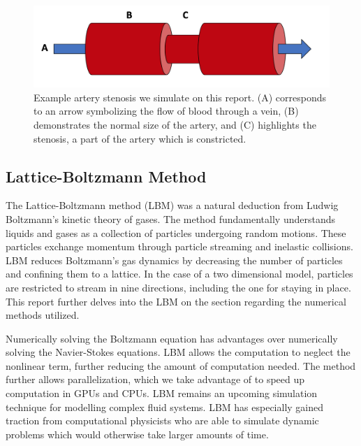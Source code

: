 \begin{figure}[H]
\includegraphics[scale=0.3]{DavidPineiro/stenosis_vein.png}
\centering
\caption{Example artery stenosis we simulate on this report. (A) corresponds to an arrow symbolizing the flow of blood through a vein, (B) demonstrates the normal size of the artery, and (C) highlights the stenosis, a part of the artery which is constricted.}
\label{fig:stenosis_example}
\end{figure}

\subsection{Lattice-Boltzmann Method}
The Lattice-Boltzmann method (LBM) was a natural deduction from Ludwig Boltzmann’s kinetic theory of gases. The method fundamentally understands liquids and gases as a collection of particles undergoing random motions. These particles exchange momentum through particle streaming and inelastic collisions. LBM reduces Boltzmann’s gas dynamics by decreasing the number of particles and confining them to a lattice. In the case of a two dimensional model, particles are restricted to stream in nine directions, including the one for staying in place. This report further delves into the LBM on the section regarding the numerical methods utilized. 


Numerically solving the Boltzmann equation has advantages over numerically solving the Navier-Stokes equations. LBM allows the computation to neglect the nonlinear term, further reducing the amount of computation needed. The method further allows parallelization, which we take advantage of to speed up computation in GPUs and CPUs. LBM remains an upcoming simulation technique for modelling complex fluid systems. LBM has especially gained traction from computational physicists who are able to simulate dynamic problems which would otherwise take larger amounts of time.  